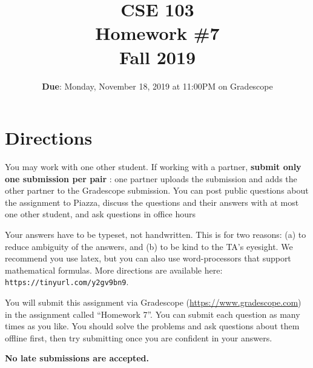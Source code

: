 \documentclass[12pt, oneside]{article}
\title{\bf CSE 103 \\[2ex]
       \Large Homework \#7\\ Fall 2019}
\begin{document}
\date{\textbf{Due}: Monday, November 18, 2019 at 11:00PM on Gradescope}
\maketitle

\section{Directions}
You may work with one other student. If working with a partner,
\textbf{submit only one submission per pair} : one partner uploads the submission and adds the other partner to the Gradescope submission. You can post public questions about the assignment to Piazza, discuss the questions and their answers with at most one other student, and ask questions in office hours

Your answers have to be typeset, not handwritten. This is for two
reasons: (a) to reduce ambiguity of the answers, and (b) to be kind to
the TA's eyesight. We recommend you use latex, but you can also use
word-processors that support mathematical formulas. More directions
are available here: {\tt https://tinyurl.com/y2gv9bn9}.

You will submit this assignment via Gradescope
(\url{https://www.gradescope.com}) in the assignment called ``Homework
7''. You can submit each question as many times as you like. You should solve the problems and ask questions about them offline first, then try submitting once you are confident in your answers. 

\textbf{No late submissions are accepted.}

\newpage
\end{document}
